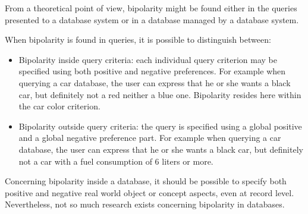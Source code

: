 From a theoretical point of view, bipolarity might be found either in the queries presented to a database system or in a database managed by a database system.

When bipolarity is found in queries, it is possible to distinguish between:
\begin{itemize}
	\item
	Bipolarity inside query criteria: each individual query criterion may be specified using both positive and negative preferences. For example when querying a car database, the user can express that he or she wants a black car, but definitely not a red neither a blue one. Bipolarity resides here within the car color criterion.
	\item
	Bipolarity outside query criteria: the query is specified using a global positive and a global negative preference part. For example when querying a car database, the user can express that he or she wants a black car, but definitely not a car with a fuel consumption of 6 liters or more.
	\end{itemize}

Concerning bipolarity inside a database, it should be possible to specify both positive and negative real world object or concept aspects, even at record level. Nevertheless, not so much research exists concerning bipolarity in databases.





%
%

